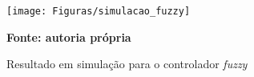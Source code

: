 \begin{figure}[ht]
\centering
\caption{Resultado em simulação para o controlador \textit{fuzzy}}
\label{fig:resultadoSimulacaoFuzzy}
		\centering
		\texttt{[image: Figuras/simulacao\_fuzzy]}

	\textbf{Fonte: autoria própria}
\end{figure}